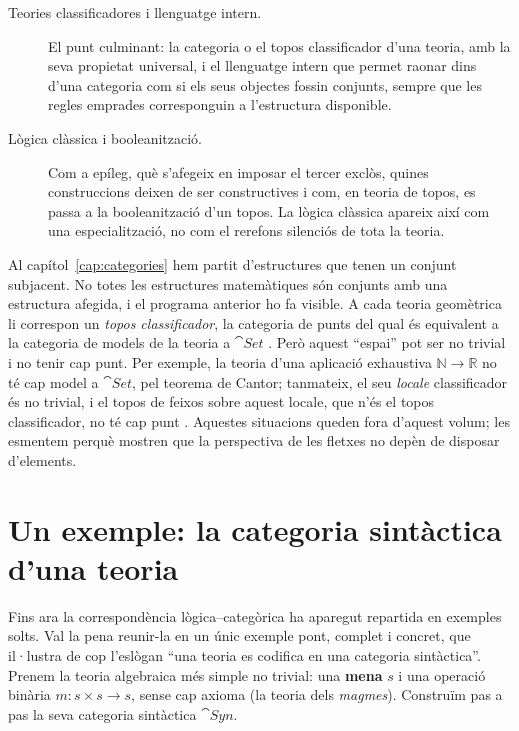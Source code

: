 \begin{description}
\item[Teories classificadores i llenguatge intern.] El punt culminant: la categoria o el topos classificador d'una teoria, amb la seva propietat universal, i el llenguatge intern que permet raonar dins d'una categoria com si els seus objectes fossin conjunts, sempre que les regles emprades corresponguin a l'estructura disponible.

\item[Lògica clàssica i booleanització.] Com a epíleg, què s'afegeix en imposar el tercer exclòs, quines construccions deixen de ser constructives i com, en teoria de topos, es passa a la booleanització d'un topos. La lògica clàssica apareix així com una especialització, no com el rerefons silenciós de tota la teoria.
\end{description}

\begin{nota}
Al capítol~\ref{cap:categories} hem partit d'estructures que tenen un conjunt subjacent. No totes les estructures matemàtiques són conjunts amb una estructura afegida, i el programa anterior ho fa visible. A cada teoria geomètrica li correspon un \emph{topos classificador}, la categoria de punts del qual és equivalent a la categoria de models de la teoria a $\cat{Set}$ \cite{caramello}. Però aquest \enquote{espai} pot ser no trivial i no tenir cap punt. Per exemple, la teoria d'una aplicació exhaustiva $\mathbb N\to\mathbb R$ no té cap model a $\cat{Set}$, pel teorema de Cantor; tanmateix, el seu \emph{locale} classificador és no trivial, i el topos de feixos sobre aquest locale, que n'és el topos classificador, no té cap punt \cite{blechschmidt}. Aquestes situacions queden fora d'aquest volum; les esmentem perquè mostren que la perspectiva de les fletxes no depèn de disposar d'elements.
\end{nota}

\section{Un exemple: la categoria sintàctica d'una teoria}\label{sec:sintactica}

Fins ara la correspondència lògica--categòrica ha aparegut repartida en exemples solts. Val la pena reunir-la en un únic exemple pont, complet i concret, que il·lustra de cop l'eslògan \enquote{una teoria es codifica en una categoria sintàctica}. Prenem la teoria algebraica més simple no trivial: una \textbf{mena} $s$ i una operació binària $m\colon s\times s\to s$, sense cap axioma (la teoria dels \emph{magmes}). Construïm pas a pas la seva categoria sintàctica $\cat{Syn}$.

